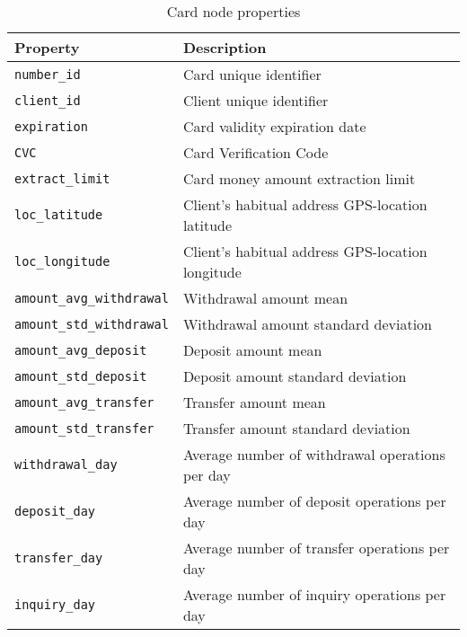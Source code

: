 \begin{table}[H]
    \centering
    \begin{tabular}{|l|l|}
    \hline
    \textbf{Property}        & \textbf{Description}                                          \\ \hline
    \texttt{number\_id}   & Card unique identifier                               \\ \hline
    \texttt{client\_id}   & Client unique identifier                               \\ \hline
    \texttt{expiration}   & Card validity expiration date                      \\ \hline
    \texttt{CVC}          & Card Verification Code                                      \\ \hline
    \texttt{extract\_limit} & Card money amount extraction limit    \\ \hline
    \texttt{loc\_latitude}  & Client's habitual address GPS-location latitude                         \\ \hline
    \texttt{loc\_longitude} & Client's habitual address GPS-location longitude                        \\ \hline
    \texttt{amount\_avg\_withdrawal} & Withdrawal amount mean\\ 
    \hline
    \texttt{amount\_std\_withdrawal} & Withdrawal amount standard deviation \\ 
    \hline
    \texttt{amount\_avg\_deposit} & Deposit amount mean \\ 
    \hline
    \texttt{amount\_std\_deposit} & Deposit amount standard deviation\\ 
    \hline
    \texttt{amount\_avg\_transfer} & Transfer amount mean \\ 
    \hline
    \texttt{amount\_std\_transfer} & Transfer amount standard deviation \\ 
    \hline
    \texttt{withdrawal\_day} & Average number of withdrawal operations per day \\ 
    \hline
    \texttt{deposit\_day} & Average number of deposit operations per day \\ 
    \hline
    \texttt{transfer\_day} & Average number of transfer operations per day \\ 
    \hline
    \texttt{inquiry\_day} & Average number of inquiry operations per day \\ 
    \hline
    \end{tabular}
    \caption{Card node properties}
    \label{table:card-node-properties}
\end{table}